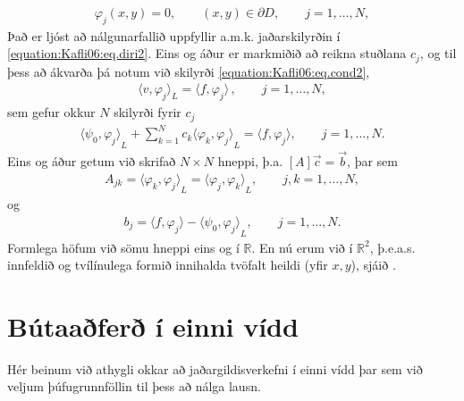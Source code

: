\documentclass[a4paper,10pt,icelandic]{sphinxmanual}
\begin{document}
\begin{equation*}
\begin{split}\varphi_j(x,y)=0,  \qquad (x,y) \in \partial D, \qquad j=1, \dots, N,\end{split}
\end{equation*}
Það er ljóst að nálgunarfallið  uppfyllir a.m.k. jaðarskilyrðin í \eqref{equation:Kafli06:eq.diri2}.
Eins og áður er markmiðið  að reikna  stuðlana \(c_j\), og til þess að ákvarða þá notum við skilyrði \eqref{equation:Kafli06:eq.cond2},
\begin{equation*}
\begin{split}\langle v, \varphi_j\rangle_L = \langle f , \varphi_j\rangle \,, \qquad j=1, \dots, N,\end{split}
\end{equation*}
sem gefur okkur \(N\) skilyrði fyrir \(c_j\)
\begin{equation*}
\begin{split}{{\langle \psi_0,\varphi_j\rangle}}_L+\sum_{k=1}^Nc_k{{\langle \varphi_k,\varphi_j\rangle}}_L
={{\langle f,\varphi_j\rangle}}, \qquad j=1,\dots,N.\end{split}
\end{equation*}
Eins og áður getum við skrifað \(N \times N\) hneppi, þ.a. \([A]\vec{c} =\vec{b}\), þar sem
\begin{equation*}
\begin{split}A_{jk}={{\langle \varphi_k,\varphi_j\rangle}}_L
={{\langle \varphi_j,\varphi_k\rangle}}_L, \qquad j,k=1,\dots,N,\end{split}
\end{equation*}
og
\begin{equation*}
\begin{split}b_j={{\langle f,\varphi_j\rangle}}-{{\langle \psi_0,\varphi_j\rangle}}_L, \qquad j=1,\dots,N.\end{split}
\end{equation*}
Formlega höfum við sömu hneppi eins og í \(\mathbb R\). En nú erum við í \(\mathbb{R}^2\), þ.e.a.s. innfeldið og tvílínulega formið innihalda tvöfalt heildi (yfir \(x, y\)), sjáið {\hyperref[\detokenize{Kafli06:ch-6-1-2}]{}}.


\section{Bútaaðferð í einni vídd}
\label{\detokenize{Kafli06:butaafer-i-einni-vidd}}
Hér beinum við  athygli okkar að jaðargildisverkefni í einni vídd þar sem við veljum þúfugrunnföllin til þess að nálga lausn.
\end{document}
